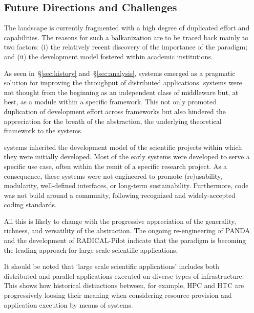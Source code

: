 \documentclass{sig-alternate}
\begin{document}
%
\subsection{Future Directions and Challenges}
\label{sec:future}

The \pilot landscape is currently fragmented with a high degree of duplicated
effort and capabilities. The reasons for such a balkanization are to be traced
back mainly to two factors: (i) the relatively recent discovery of the
importance of the \pilot paradigm; and (ii) the development model fostered
within academic institutions.

As seen in~\S\ref{sec:history} and~\S\ref{sec:analysis}, \pilot systems emerged
as a pragmatic solution for improving the throughput of distributed
applications. \pilot systems were not thought from the beginning as an
independent class of middleware but, at best, as a module within a specific
framework. This not only promoted duplication of development effort across
frameworks but also hindered the appreciation for the breath of the \pilot
abstraction, the underlying theoretical framework to the \pilot systems.

\pilot systems inherited the development model of the scientific projects
within which they were initially developed. Most of the early \pilot systems
were developed to serve a specific use case, often within the remit of a
specific research project. As a consequence, these systems were not engineered
to promote (re)usability, modularity, well-defined interfaces, or long-term
sustainability. Furthermore, code was not build around a community, following
recognized and widely-accepted coding standards.

All this is likely to change with the progressive appreciation of the
generality, richness, and versatility of the \pilot abstraction. The ongoing
re-engineering of PANDA and the development of RADICAL-Pilot indicate that the
\pilot paradigm is becoming the leading approach for large scale scientific
applications.

It should be noted that `large scale scientific applications' includes both
distributed and parallel applications executed on diverse types of
infrastructure. This shows how historical distinctions between, for example,
HPC and HTC are progressively loosing their meaning when considering resource
provision and application execution by means of \pilot systems.
\end{document}
